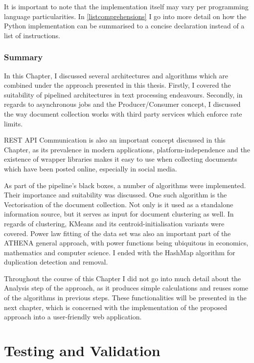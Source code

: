 \documentclass[12pt,a4paper,twoside]{report}
\begin{document}
It is important to note that the implementation itself may vary per programming language particularities. In \ref{listcomprehensions} I go into more detail on how the Python implementation can be summarised to a concise declaration instead of a list of instructions.

\subsection*{Summary}
In this Chapter, I discussed several architectures and algorithms which are combined under the approach presented in this thesis. Firstly, I covered the suitability of pipelined architectures in text processing endeavours. Secondly, in regards to asynchronous jobs and the Producer/Consumer concept, I discussed the way document collection works with third party services which enforce rate limits.

REST API Communication is also an important concept discussed in this Chapter, as its prevalence in modern applications, platform-independence and the existence of wrapper libraries makes it easy to use when collecting documents which have been posted online, especially in social media.

As part of the pipeline's black boxes, a number of algorithms were implemented. Their importance and suitability was discussed. One such algorithm is the Vectorisation of the document collection. Not only is it used as a standalone information source, but it serves as input for document clustering as well. In regards of clustering, KMeans and its centroid-initialisation variants were covered. Power law fitting of the data set was also an important part of the ATHENA general approach, with power functions being ubiquitous in economics, mathematics and computer science. I ended with the HashMap algorithm for duplication detection and removal.

Throughout the course of this Chapter I did not go into much detail about the Analysis step of the approach, as it produces simple calculations and reuses some of the algorithms in previous steps. These functionalities will be presented in the next chapter, which is concerned with the implementation of the proposed approach into a user-friendly web application.



\chapter{Testing and Validation}
\end{document}
